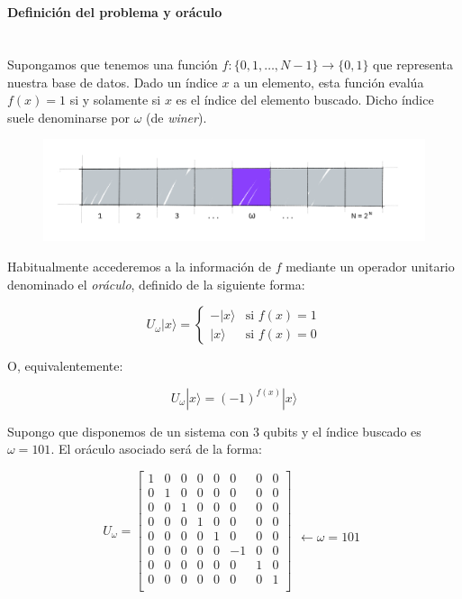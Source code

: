 \documentclass[11pt]{article}
\newcommand{\ra}{\rangle}
\newcommand{\myparagraph}[1]{\paragraph*{ \\ #1}\mbox{}\\}
\theoremstyle{plain}
\begin{document}
\myparagraph{Definición del problema y oráculo}

Supongamos que tenemos una función $f: \{0, 1, \ldots, N-1\} \longrightarrow \{0,1\}$ que representa nuestra base de datos. Dado un índice $x$ a un elemento, esta función evalúa $f(x) = 1$ si y solamente si $x$ es el índice del elemento buscado. Dicho índice suele denominarse por $\omega$ (de \emph{winer}).

\begin{figure}[H]
	\centering
	\includegraphics[scale=0.5]{figures/grover1.png}
\end{figure}

Habitualmente accederemos a la información de $f$ mediante un operador unitario denominado el \emph{oráculo}, definido de la siguiente forma:

\[
	U_\omega|x\ra = 
	\begin{cases}
		-|x\ra & \text{si } f(x) = 1 \\
		|x\ra  & \text{si } f(x) = 0
	\end{cases}
\]

O, equivalentemente:

\[
	U_\omega|x\ra = (-1)^{f(x)}|x\ra
\]
	
Supongo que disponemos de un sistema con 3 qubits y el índice buscado es $\omega = 101$. El oráculo asociado será de la forma:

\[
	U_\omega = 
	\begin{bmatrix}
		1 & 0 & 0 & 0 & 0 & 0 & 0 & 0 \\
		0 & 1 & 0 & 0 & 0 & 0 & 0 & 0 \\
		0 & 0 & 1 & 0 & 0 & 0 & 0 & 0 \\
		0 & 0 & 0 & 1 & 0 & 0 & 0 & 0 \\
		0 & 0 & 0 & 0 & 1 & 0 & 0 & 0 \\
		0 & 0 & 0 & 0 & 0 & -1 & 0 & 0 \\
		0 & 0 & 0 & 0 & 0 & 0 & 1 & 0 \\
		0 & 0 & 0 & 0 & 0 & 0 & 0 & 1 \\
	\end{bmatrix}
	\begin{aligned}
		\\
		\\
		\\
		\\
		\\
		\\
		\leftarrow \omega = \text{101}\\
		\\
		\\
		\\
	\end{aligned}
\]
\end{document}

